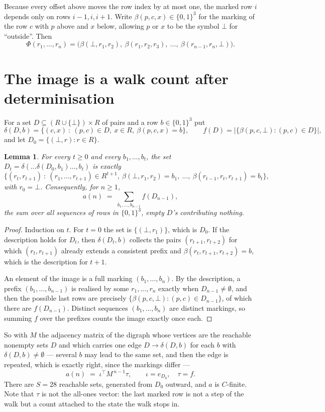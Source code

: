 \documentclass[11pt,a4paper]{article}
\theoremstyle{plain}
\newtheorem{lemma}[theorem]{Lemma}
\theoremstyle{definition}
\begin{document}
Because every offset above moves the row index by at most one, the marked row $i$ depends only
on rows $i-1,i,i+1$. Write $\beta(p,c,x)\in\{0,1\}^{3}$ for the marking of the row $c$
with $p$ above and $x$ below, allowing $p$ or $x$ to be the symbol $\bot$ for ``outside''.
Then
\[
\Phi(r_1,\dots,r_n)=\bigl(\beta(\bot,r_1,r_2),\ \beta(r_1,r_2,r_3),\ \dots,\
\beta(r_{n-1},r_n,\bot)\bigr).
\]

\section{The image is a walk count after determinisation}

For a set $D\subseteq(R\cup\{\bot\})\times R$ of pairs and a row $b\in\{0,1\}^{3}$ put
\[
\delta(D,b)=\{(c,x)\ :\ (p,c)\in D,\ x\in R,\ \beta(p,c,x)=b\},\qquad
f(D)=\bigl|\{\beta(p,c,\bot):(p,c)\in D\}\bigr| ,
\]
and let $D_0=\{(\bot,r):r\in R\}$.

\begin{lemma}\label{lem:det}
For every $t\ge0$ and every $b_1,\dots,b_t$, the set
$D_t=\delta(\dots\delta(D_0,b_1)\dots,b_t)$ is exactly
\[
\{(r_t,r_{t+1})\ :\ (r_1,\dots,r_{t+1})\in R^{t+1},\ \beta(\bot,r_1,r_2)=b_1,\ \dots,\
\beta(r_{t-1},r_t,r_{t+1})=b_t\} ,
\]
with $r_0=\bot$. Consequently, for $n\ge1$,
\[
a(n)\;=\;\sum_{b_1,\dots,b_{n-1}}f(D_{n-1}),
\]
the sum over all sequences of rows in $\{0,1\}^{3}$, empty $D$'s contributing nothing.
\end{lemma}

\begin{proof}
Induction on $t$. For $t=0$ the set is $\{(\bot,r_1)\}$, which is $D_0$. If the description
holds for $D_t$, then $\delta(D_t,b)$ collects the pairs $(r_{t+1},r_{t+2})$ for which
$(r_t,r_{t+1})$ already extends a consistent prefix and
$\beta(r_t,r_{t+1},r_{t+2})=b$, which is the description for $t+1$.

An element of the image is a full marking $(b_1,\dots,b_n)$. By the description, a prefix
$(b_1,\dots,b_{n-1})$ is realised by some $r_1,\dots,r_n$ exactly when $D_{n-1}\neq
\emptyset$, and then the possible last rows are precisely
$\{\beta(p,c,\bot):(p,c)\in D_{n-1}\}$, of which there are $f(D_{n-1})$. Distinct
sequences $(b_1,\dots,b_n)$ are distinct markings, so summing $f$ over the prefixes counts the
image exactly once each.
\end{proof}

So with $M$ the adjacency matrix of the digraph whose vertices are the reachable nonempty sets
$D$ and which carries one edge $D\to\delta(D,b)$ for each $b$ with $\delta(D,b)\neq\emptyset$
--- several $b$ may lead to the same set, and then the edge is repeated, which is exactly
right, since the markings differ ---
\[
a(n)\;=\;\iota^{\!\top}M^{\,n-1}\tau,\qquad \iota=e_{D_0},\quad \tau=f .
\]
There are $S=28$ reachable sets, generated from $D_0$ outward, and $a$ is $C$-finite. Note
that $\tau$ is not the all-ones vector: the last marked row is not a step of the walk but a
count attached to the state the walk stops in.
\end{document}
